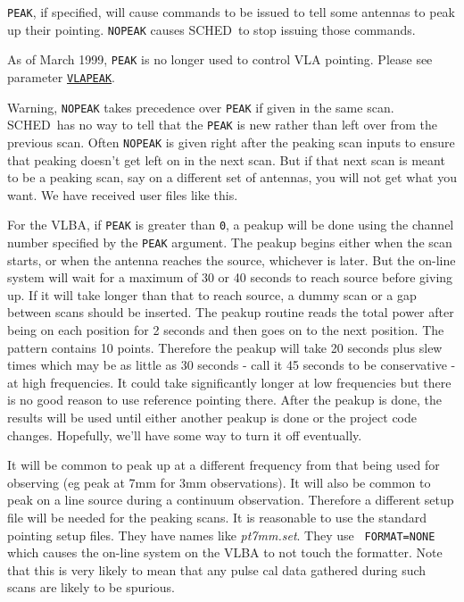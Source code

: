 \documentclass{report}
\newcommand{\schedb}{{\sc SCHED~}}
\begin{document}
{\tt PEAK}, if specified, will cause commands to be issued to tell
some antennas to peak up their pointing.  {\tt NOPEAK} causes
\schedb to stop issuing those commands.

As of March 1999, {\tt PEAK} is no longer used to control VLA
pointing.  Please see parameter 
{\hyperref[MP:VLAPEAK]{{\tt VLAPEAK}}}.

Warning, {\tt NOPEAK} takes precedence over {\tt PEAK} if given in
the same scan.  \schedb has no way to tell that the {\tt PEAK} is new
rather than left over from the previous scan.  Often {\tt NOPEAK}
is given right after the peaking scan inputs to ensure that peaking
doesn't get left on in the next scan.  But if that next scan is 
meant to be a peaking scan, say on a different set of antennas, you
will not get what you want.  We have received user files like this.

For the VLBA, if {\tt PEAK} is greater than {\tt 0}, a peakup will be
done using the channel number specified by the {\tt PEAK} argument.
The peakup begins either when the scan starts, or when the antenna
reaches the source, whichever is later.  But the on-line system will
wait for a maximum of 30 or 40 seconds to reach source before giving
up. If it will take longer than that to reach source, a dummy scan or
a gap between scans should be inserted. The peakup routine reads the
total power after being on each position for 2 seconds and then goes
on to the next position. The pattern contains 10 points. Therefore the
peakup will take 20 seconds plus slew times which may be as little as
30 seconds - call it 45 seconds to be conservative - at high
frequencies. It could take significantly longer at low frequencies but
there is no good reason to use reference pointing there. After the
peakup is done, the results will be used until either another peakup
is done or the project code changes.  Hopefully, we'll have some way
to turn it off eventually.

It will be common to peak up at a different frequency from that being
used for observing (eg peak at 7mm for 3mm observations).  It will
also be common to peak on a line source during a continuum
observation.  Therefore a different setup file will be needed for the
peaking scans.  It is reasonable to use the standard pointing setup
files.  They have names like {\sl pt7mm.set}.  They use {\tt
FORMAT=NONE} which causes the on-line system on the VLBA to
not touch the formatter.  Note that this is very likely to mean
that any pulse cal data gathered during such scans are likely to
be spurious.
\end{document}
